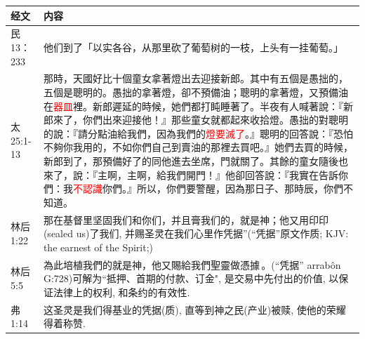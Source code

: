 \begin{table}[H]
\centering
\begin{tabular}{p{6em}|p{43em}}  \toprule
经文&内容\\  \midrule
民13：233&他们到了「以实各谷，从那里砍了葡萄树的一枝，上头有一挂葡萄。」\\  \midrule
太25:1-13&那時，天國好比十個童女拿著燈出去迎接新郎。其中有五個是愚拙的，五個是聰明的。愚拙的拿著燈，卻不預備油；聰明的拿著燈，又預備油在\textcolor{red}{器皿}裡。新郎遲延的時候，她們都打盹睡著了。半夜有人喊著說：『新郎來了，你們出來迎接他！』那些童女就都起來收拾燈。愚拙的對聰明的說：『請分點油給我們，因為我們的\textcolor{red}{燈要滅了}。』聰明的回答說：『恐怕不夠你我用的，不如你們自己到賣油的那裡去買吧。』她們去買的時候，新郎到了，那預備好了的同他進去坐席，門就關了。其餘的童女隨後也來了，說：『主啊，主啊，給我們開門！』他卻回答說：『我實在告訴你們：我\textcolor{red}{不認識}你們。』所以，你們要警醒，因為那日子、那時辰，你們不知道。\\  \midrule
林后1:22&那在基督里坚固我们和你们，并且膏我们的，就是神；他又用印印(sealed us)了我们, 并赐圣灵在我们心里作凭据”(“凭据”原文作质; KJV: the earnest of the Spirit;) \\  \midrule
林后5:5&為此培植我們的就是神，他又賜給我們聖靈做憑據 。(“凭据” arrabôn {G:728})可解为“抵押、首期的付款、订金", 是交易中先付出的价值, 以保证法律上的权利, 和条约的有效性. \\  \midrule
弗1:14&这圣灵是我们得基业的凭据(质), 直等到神之民(产业)被赎, 使他的荣耀得着称赞. \\  \midrule
\end{tabular}
\end{table}




 

